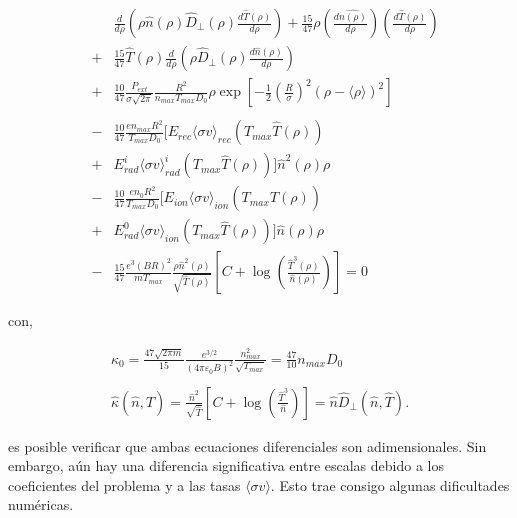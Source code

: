 \begin{eqnarray}\label{eq:energyn}
	&& \frac{d}{d\rho}\left(\rho \hat{n}(\rho) \hat{D}_\perp(\rho)\frac{d\hat{T}(\rho)}{d\rho} \right) + \frac{15}{47}\rho\left(\frac{d\hat{n(\rho)}}{d\rho}\right)\left(\frac{d\hat{T}(\rho)}{d\rho}\right) \nonumber \\
	&+& \frac{15}{47}\hat{T}(\rho)\frac{d}{d\rho}\left(\rho \hat{D}_\perp(\rho) \frac{d\hat{n}(\rho)}{d\rho}\right) \nonumber \\ 
	&+& \frac{10}{47}\frac{P_{ext}}{\sigma\sqrt{2\pi}}\frac{R^2}{n_{max}T_{max}D_0}\rho\exp{\left[-\frac{1}{2}\left(\frac{R}{\sigma}\right)^2(\rho - \langle \rho \rangle)^2\right]}\nonumber \\ \nonumber\\
	&-& \frac{10}{47}\frac{ e n_{max}R^2}{T_{max} D_0}\biggl[E_{rec}\langle \sigma v \rangle_{rec}(T_{max}\hat{T}(\rho))\nonumber \\   
	&+& E_{rad}^i\langle \sigma v \rangle_{rad}^i(T_{max}\hat{T}(\rho))\biggr]\hat{n}^2(\rho)\rho \nonumber \\ 
	&-& \frac{10}{47}\frac{e n_0R^2}{T_{max}D_0}\biggl[ E_{ion}\langle \sigma v \rangle_{ion}(T_{max}\hat{T}(\rho)) \nonumber\\ 
	&+& E_{rad}^0\langle \sigma v \rangle_{ion}(T_{max}\hat{T}(\rho)) \biggr]\hat{n}(\rho)\rho \nonumber \\ 
	&-&\frac{15}{47}\frac{e^3(BR)^2}{mT_{max}}\frac{\rho \hat{n}^2(\rho)}{\sqrt{\hat{T}(\rho)}}\left[ C + \log{ \left( \frac{\hat{T}^3(\rho)}{\hat{n}(\rho)}\right)} \right] = 0 \quad
\end{eqnarray}

con,

\begin{eqnarray}
	\kappa_0 = \frac{47\sqrt{2\pi m}}{15}\frac{e^{3/2}}{(4\pi \varepsilon_0 B)^2}\frac{n^2_{max}}{\sqrt{T_{max}}} = \frac{47}{10}n_{max}D_0\\ \nonumber\\
	\hat{\kappa}(\hat{n}, \hat{T}) = \frac{\hat{n}^2}{\sqrt{\hat{T}}} \left[ C + \log{\left(\frac{\hat{T}^3}{\hat{n}} \right)}\right] = \hat{n}\hat{D}_\perp(\hat{n}, \hat{T}).
\end{eqnarray}

 es posible verificar que ambas ecuaciones diferenciales son adimensionales. Sin embargo, aún hay una diferencia significativa entre escalas debido a los coeficientes del problema y a las tasas $\langle\sigma v\rangle$. Esto trae consigo algunas dificultades numéricas. 
 
